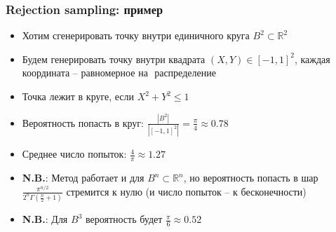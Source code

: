 \documentclass[10pt]{beamer}
\begin{document}
\begin{frame}[fragile]
\frametitle{Rejection sampling: пример}
\begin{itemize}
\item Хотим сгенерировать точку внутри единичного круга \begin{math}B^2 \subset \mathbb{R}^2\end{math}
\pause
\item Будем генерировать точку внутри квадрата \begin{math}(X,Y) \in [-1, 1]^2\end{math}, каждая координата -- равномерное на \begin{math}[-1, 1]\end{math} распределение
\pause
\item Точка лежит в круге, если \begin{math}X^2+Y^2\leq 1\end{math}
\pause
\item Вероятность попасть в круг: \begin{math}\frac{|B^2|}{|[-1,1]^2|}=\frac{\pi}{4}\approx 0.78\end{math}
\pause
\item Среднее число попыток: \begin{math}\frac{4}{\pi}\approx 1.27\end{math}
\pause
\item \alert{\textbf{N.B.}}: Метод работает и для \begin{math}B^n\subset \mathbb R^n\end{math}, но вероятность попасть в шар \begin{math}\frac{\pi^{n/2}}{2^n \Gamma(\frac{n}{2}+1)}\end{math} стремится к нулю (и число попыток -- к бесконечности)
\pause
\item \alert{\textbf{N.B.}}: Для \begin{math}B^3\end{math} вероятность будет \begin{math}\frac{\pi}{6}\approx 0.52\end{math}
\end{itemize}
\end{frame}
\end{document}
